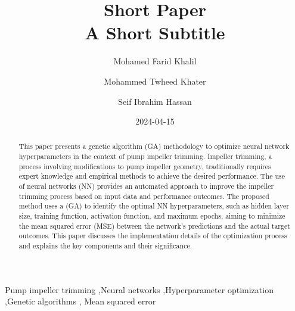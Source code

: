 \documentclass[
  super,
  review,
  3p]{elsarticle}
\date{2024-04-15}
\begin{document}
\begin{frontmatter}
\title{Short Paper \\\large{A Short Subtitle} }
\author[1]{Mohamed Farid Khalil%
%
}
\author[1]{Mohammed Twheed Khater%
%
}
\author[1]{Seif Ibrahim Hassan%
%
}



        
\begin{abstract}
This paper presents a genetic algorithm (GA) methodology to optimize
neural network hyperparameters in the context of pump impeller trimming.
Impeller trimming, a process involving modifications to pump impeller
geometry, traditionally requires expert knowledge and empirical methods
to achieve the desired performance. The use of neural networks (NN)
provides an automated approach to improve the impeller trimming process
based on input data and performance outcomes. The proposed method uses a
(GA) to identify the optimal NN hyperparameters, such as hidden layer
size, training function, activation function, and maximum epochs, aiming
to minimize the mean squared error (MSE) between the network's
predictions and the actual target outcomes. This paper discusses the
implementation details of the optimization process and explains the key
components and their significance.
\end{abstract}





\begin{keyword}
    Pump impeller trimming \sep Neural networks \sep Hyperparameter
optimization \sep Genetic algorithms \sep 
    Mean squared error
\end{keyword}
\end{frontmatter}
    
\begin{nomenclature}
\begin{deflist}[AA] %

\end{deflist}

\begin{deflist}[AAA] %


\end{deflist}
\end{nomenclature}
\end{document}
